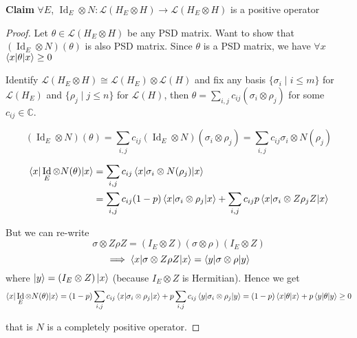 \documentclass{article}
\DeclareMathOperator{\Id}{Id}
\begin{document}
\textbf{Claim} $\forall E$, $\Id_E \otimes N : \mathscr{L}(H_E \otimes H) \to \mathscr{L}(H_E \otimes H)$ is a positive operator
\begin{proof}

Let $\theta \in \mathscr{L}(H_E \otimes H)$ be any PSD matrix. Want to show that $(\Id_E \otimes N)(\theta)$ is also PSD matrix. 
Since $\theta$ is a PSD matrix, we have $\forall x$ $\braket{x|\theta|x} \geq 0$

Identify $\mathscr{L}(H_E \otimes H) \cong \mathscr{L}(H_E) \otimes \mathscr{L}(H)$ and fix any basis $\{\sigma_i \mid i \leq m\}$ for $\mathscr{L}(H_E)$ and $\{\rho_j \mid j \leq n\}$ for $\mathscr{L}(H)$, then $\theta = \sum_{i,j} c_{ij} (\sigma_i \otimes \rho_j)$ for some $c_{ij} \in \mathbb{C}$.

$$(\Id_E \otimes N)(\theta) = \sum_{i,j} c_{ij} (\Id_E \otimes N)(\sigma_i \otimes \rho_j) = \sum_{i,j} c_{ij} \sigma_i \otimes N(\rho_j)$$

\begin{align*}
    \braket{x | \Id_E \otimes N(\theta) | x} &= \sum_{i,j} c_{ij} \braket{x | \sigma_i \otimes N(\rho_j) | x} \\
    &= \sum_{i,j} c_{ij} (1-p) \braket{x | \sigma_i \otimes \rho_j | x} + \sum_{i,j} c_{ij} p \braket{x | \sigma_i \otimes Z\rho_j Z | x} \\
\end{align*}

But we can re-write $$\sigma \otimes Z \rho Z = (I_E \otimes Z)(\sigma \otimes \rho)(I_E \otimes Z)$$ $$\implies \braket{x|\sigma \otimes Z \rho Z|x} = \braket{y|\sigma \otimes \rho|y}$$ 
where $\ket{y} = (I_E \otimes Z) \ket{x}$ (because $I_E \otimes Z$ is Hermitian). Hence we get
$$\braket{x | \Id_E \otimes N(\theta) | x} = (1-p) \sum_{i,j} c_{ij} \braket{x | \sigma_i \otimes \rho_j | x} + p \sum_{i,j} c_{ij} \braket{y | \sigma_i \otimes \rho_j | y} = (1-p)\braket{x|\theta|x} + p\braket{y|\theta|y} \geq 0$$

that is $N$ is a completely positive operator.
\end{proof}

\end{document}
